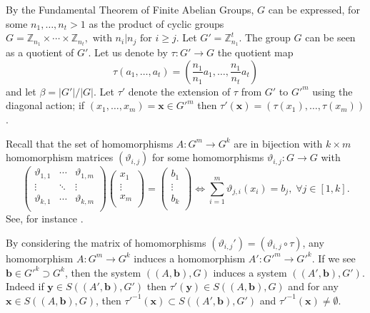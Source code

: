 \documentclass[10pt]{article}
\newcommand{\Z}{\mathbb Z}
\begin{document}


By the Fundamental Theorem of Finite Abelian Groups, $G$ can be expressed, for some $n_1,\ldots,n_t> 1$ as the product of cyclic groups
$
G=\Z_{n_1}\times \cdots \times \Z_{n_t}, \text{ with } n_i|n_j \text{ for } i\geq j.
$
Let $G'=\Z_{n_1}^t$. The group $G$ can be seen as a quotient of $G'$. Let us denote by $\tau:G'\to G$ the quotient map
\begin{displaymath}
	\tau(a_1,\ldots,a_t)= \left(\frac{n_1}{n_1}a_1,\ldots,\frac{n_1}{n_t}a_t\right)
\end{displaymath}
and let $\beta=|G'|/|G|$. Let $\tau'$ denote the extension of $\tau$ from $G'$ to $G'^m$ using the diagonal action; if $(x_1,\ldots,x_m)=\mathbf{x}\in G'^m$ then $\tau'(\mathbf{x})=(\tau(x_1),\ldots,\tau(x_m))$.


Recall that the set of homomorphisms $A:G^m\to G^k$ are in bijection with $k\times m$ homomorphism matrices $(\vartheta_{i,j})$ for some homomorphisms $\vartheta_{i,j}:G\to G$ with
\begin{equation}
\left(
	\begin{array}{ccc}
		\vartheta_{1,1} & \cdots & \vartheta_{1,m}  \\
		\vdots  &\ddots & \vdots \\
		\vartheta_{k,1} &  \cdots & \vartheta_{k,m} \\
		\end{array}\right)
		\left(\begin{array}{c}
		x_1 \\
		\vdots \\
			x_m \\
			\end{array}\right)	
	=	\left(\begin{array}{c}
			b_1 \\
			\vdots \\
				b_k \\
				\end{array}\right)
				\iff
\sum_{i=1}^m \vartheta_{j,i}(x_i)=b_j, \; \forall j\in [1,k].\nonumber
\end{equation}
See, for instance \cite[Section 13.10, p. 66]{vandW91-2}.

By considering the matrix of homomorphisms $(\vartheta_{i,j}')=(\vartheta_{i,j}\circ \tau)$, any homomorphism $A:G^m\to G^k$ induces a homomorphism $A':G'^m\to G'^k$. If we see $\mathbf{b}\in G'^k\supset G^k$, then the system $((A,\mathbf{b}),G)$ induces a system $((A',\mathbf{b}),G')$. Indeed if $\mathbf{y}\in S((A',\mathbf{b}),G')$ then $\tau'(\mathbf{y})\in S((A,\mathbf{b}),G)$ and for any $\mathbf{x}\in S((A,\mathbf{b}),G)$, then $\tau'^{-1}(\mathbf{x})\subset S((A',\mathbf{b}),G')$ and $\tau'^{-1}(\mathbf{x})\neq \emptyset$.
\end{document}
